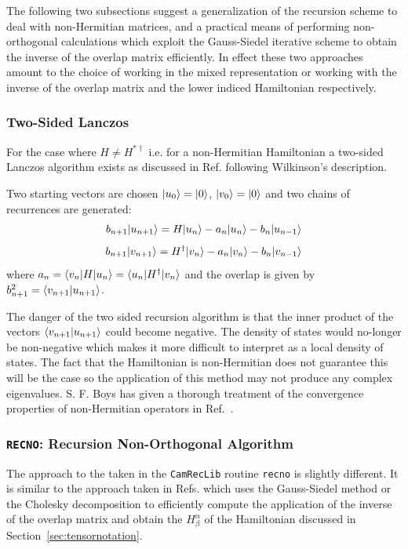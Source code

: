 The following two subsections suggest a generalization of the recursion
scheme to deal with non-Hermitian matrices, and a practical means
of performing non-orthogonal calculations which exploit the Gauss-Siedel
iterative scheme to obtain the inverse of the overlap matrix efficiently.
In effect these two approaches amount to the choice of working
in the mixed representation or working with the inverse of the overlap
matrix and the lower indiced Hamiltonian respectively.

\subsubsection{Two-Sided Lanczos}
For the case where $H\neq H^{*\dagger}$ i.e. for a non-Hermitian
Hamiltonian a two-sided Lanczos algorithm exists as discussed in
Ref.\cite{haydockkelly75} following Wilkinson's description.

Two starting vectors are chosen $|u_{0}\rangle=|0\rangle$, $|v_{0}\rangle=|0\rangle$
and two chains of recurrences are generated:
%
\begin{equation}
b_{n+1}|u_{n+1}\rangle = H|u_{n}\rangle - a_{n}|u_{n}\rangle - b_{n}|u_{n-1}\rangle
\end{equation}
%
\begin{equation}
b_{n+1}|v_{n+1}\rangle = H^{\dagger}|v_{n}\rangle - a_{n}|v_{n}\rangle - b_{n}|v_{n-1}\rangle
\end{equation}
%
where $a_{n} = \langle v_{n}|H|u_{n}\rangle = \langle u_{n}|H^{\dagger}|v_{n}\rangle$
and the overlap is given by $b^{2}_{n+1} = \langle v_{n+1}|u_{n+1}\rangle$.

The danger of the two sided recursion algorithm is that the inner
product of the vectors $\langle v_{n+1}|u_{n+1}\rangle$ could become negative.
The density of states would no-longer be non-negative which makes it
more difficult to interpret as a local density of states. The fact 
that the Hamiltonian is non-Hermitian does not guarantee this will 
be the case so the application of this method may not produce 
any complex eigenvalues. S. F. Boys has given a thorough treatment
of the convergence properties of non-Hermitian operators in Ref.~\cite{boys69}.

\subsubsection{\texttt{RECNO}: Recursion Non-Orthogonal Algorithm}
The approach to the  taken in the 
\texttt{CamRecLib} routine \texttt{recno} is slightly different.
It is similar to the approach taken in Refs.\cite{jones84, jones85} which
uses the Gauss-Siedel method or the Cholesky decomposition
to efficiently compute the application of the inverse of the overlap matrix
and obtain the $H^{\alpha}_{\beta}$ of the Hamiltonian discussed in 
Section~\ref{sec:tensornotation}.

